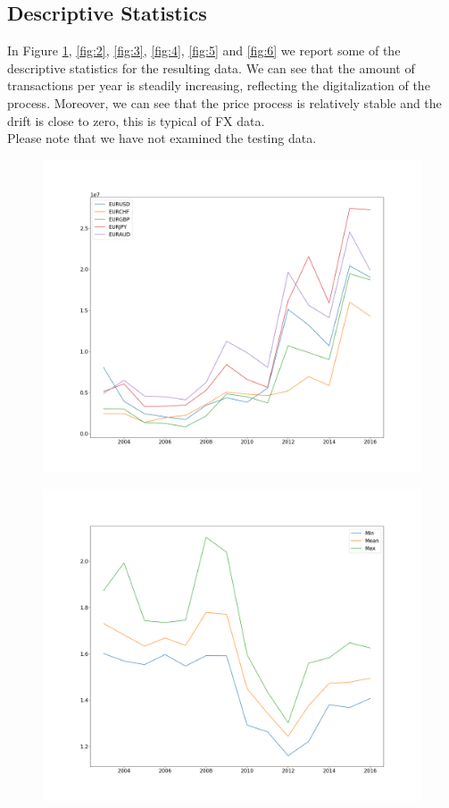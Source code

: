 \documentclass[a4paper]{article}
\begin{document}
\subsection{Descriptive Statistics} 

In Figure \ref{fig:1}, \ref{fig:2}, \ref{fig:3}, \ref{fig:4}, \ref{fig:5} and \ref{fig:6} we report some of the descriptive statistics for the resulting data. We can see that the amount of transactions per year is steadily increasing, reflecting the digitalization of the process. Moreover, we can see that the price process is relatively stable and the drift is close to zero, this is typical of FX data.\\
Please note that we have not examined the testing data.

\begin{figure}
	\centering
	\begin{minipage}{.5\textwidth}
		\centering
		\includegraphics[width=\linewidth]{Figures/counts}
		\label{fig:1}
	\end{minipage}%
	\begin{minipage}{.5\textwidth}
		\centering
		\includegraphics[width=\linewidth]{Figures/stats_aud}

\end{minipage}
\end{figure}
\end{document}
